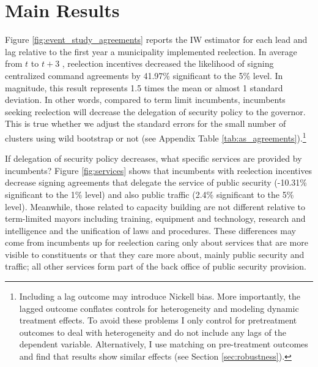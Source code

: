 \section{Main Results \label{sec:results}}


   
Figure \ref{fig:event_study_agreements} reports the IW estimator %
 for each lead and lag relative to the first year a municipality implemented reelection. In average from $t$ to $t+3$ , reelection incentives decreased the likelihood of signing centralized command agreements by 41.97\% significant to the 5\% level. In magnitude, this result represents 1.5 times the mean or almost 1 standard deviation. In other words, compared to term limit incumbents, incumbents seeking reelection will decrease the delegation of security policy to the governor. This is true whether we adjust the standard errors for the small number of clusters using wild bootstrap or not (see Appendix Table \ref{tab:as_agreements}).\footnote{Including a lag outcome may introduce Nickell bias. More importantly, the lagged outcome conflates controls for heterogeneity and modeling dynamic treatment effects. To avoid these problems I only control for pretreatment outcomes to deal with heterogeneity and do not include  any lags of the dependent variable. Alternatively, I use matching on pre-treatment outcomes and find that results show similar effects (see Section \ref{sec:robustness}).}   
         
     
If delegation of security policy decreases, what specific services are provided by incumbents? Figure \ref{fig:services} shows that incumbents with reelection incentives decrease signing agreements that delegate the service of public security (-10.31\% significant to the 1\% level) and also public traffic (2.4\% significant to the 5\% level). Meanwhile, those related to capacity building are not different relative to term-limited mayors including training, equipment and technology, research and intelligence and the unification of laws and procedures. These differences may come from incumbents up for reelection caring only about services that are more visible to constituents or that they care more about, mainly public security and traffic; all other services form part of the back office of public security provision.  

